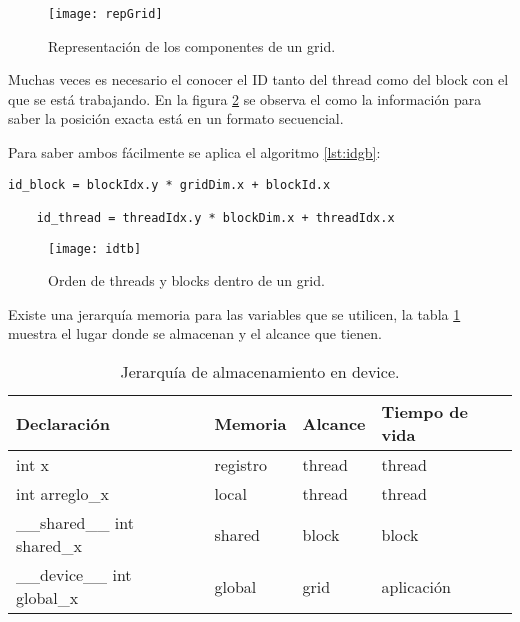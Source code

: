     \begin{figure}[ht]
      \centering
        \texttt{[image: repGrid]}
        \caption{Representación de los componentes de un grid\cite{CUDAP}.}
        \label{fig:grid}
    \end{figure}
    
    Muchas veces es necesario el conocer el ID tanto del thread como del block con el que se está trabajando. En la figura \ref{fig:grid} se observa el como la información para saber la posición exacta está en un formato secuencial. 
            
   \vspace{0.3cm}
   
    Para saber ambos fácilmente se aplica el algoritmo \ref{lst:idgb}:
    
    \begin{lstlisting}[style=CStyle, frame=single,label=lst:idgb,  basicstyle=\ttfamily\footnotesize, caption=Transformación para obtener id del thread y del block.] 
    id_block = blockIdx.y * gridDim.x + blockId.x
    
    id_thread = threadIdx.y * blockDim.x + threadIdx.x
    \end{lstlisting}
    
    \begin{figure}[ht]
      \centering
        \texttt{[image: idtb]}
        \caption{Orden de threads y blocks dentro de un grid\cite{CUDAP}.}
        \label{fig:grid}
    \end{figure}
    
    Existe una jerarquía memoria para las variables que se utilicen, la tabla \ref{tab:memoriaCUDA} muestra el lugar donde se almacenan y el alcance que tienen.
    
         \begin{table}[h!]
         \footnotesize
      \begin{center}
        \begin{tabular}{|m{4.6cm}|m{2.6cm}|m{2.6cm}|m{3cm}|}
         \hline
         \cellcolor{lightgray}\textbf{Declaración} & 
         \cellcolor{lightgray}\textbf{Memoria} &
         \cellcolor{lightgray}\textbf{Alcance} &
         \cellcolor{lightgray}\textbf{Tiempo de vida}\\ 
         \hline
        int x & registro & thread & thread\\ 
         \hline
        int arreglo\_x & local & thread & thread\\ 
         \hline
        \_\_shared\_\_ int shared\_x & shared & block & block\\ 
         \hline
        \_\_device\_\_ int global\_x & global & grid & aplicación\\ 
         \hline
           \end{tabular}
        \caption{Jerarquía de almacenamiento en device.}
        \label{tab:memoriaCUDA}
      \end{center}
    \end{table}
    
